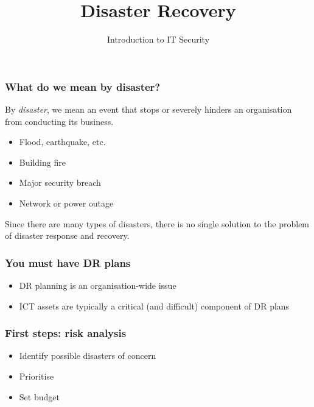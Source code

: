 \documentclass[10pt]{beamer}
\title{Disaster Recovery}
\author[IN618]{Introduction to IT Security}
\institute[Otago Polytechnic]{
  Otago Polytechnic \\
  Dunedin, New Zealand \\
}
\date{}
\begin{document}
\begin{frame}[plain]
  \titlepage
\end{frame}



\begin{frame}
  \frametitle{What do we mean by disaster?}

 By \emph{disaster}, we mean an event that stops or severely hinders
 an organisation from conducting its business.

 \begin{itemize}
  \item Flood, earthquake, etc.
  \item Building fire
  \item Major security breach
  \item Network or power outage
 \end{itemize}
\end{frame}

Since there are many types of disasters, there is no single solution
to the problem of disaster response and recovery.

\begin{frame}
  \frametitle{You must have DR plans}


 \begin{itemize}
  \item DR planning is an organisation-wide issue
  \item ICT assets are typically a critical (and difficult) component of DR plans
 \end{itemize}
\end{frame}


\begin{frame}
  \frametitle{First steps: risk analysis}


 \begin{itemize}
  \item Identify possible disasters of concern 
  \item Prioritise
  \item Set budget
 \end{itemize}
\end{frame}
\end{document}
